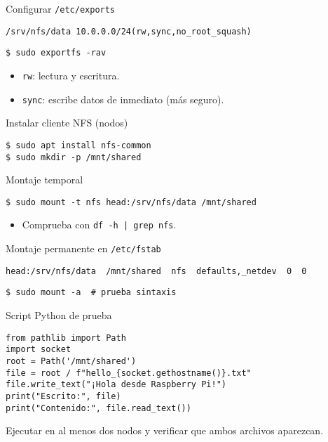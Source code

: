 \documentclass[aspectratio=169,professionalfonts]{beamer}
\begin{document}
\begin{frame}[fragile]{Configurar \texttt{/etc/exports}}
  \begin{verbatim}
/srv/nfs/data 10.0.0.0/24(rw,sync,no_root_squash)
  \end{verbatim}
  \begin{verbatim}
$ sudo exportfs -rav
  \end{verbatim}
  \begin{itemize}
    \item \texttt{rw}: lectura y escritura.
    \item \texttt{sync}: escribe datos de inmediato (más seguro).
  \end{itemize}
\end{frame}

\begin{frame}[fragile]{Instalar cliente NFS (nodos)}
  \begin{verbatim}
$ sudo apt install nfs-common
$ sudo mkdir -p /mnt/shared
  \end{verbatim}
\end{frame}

\begin{frame}[fragile]{Montaje temporal}
  \begin{verbatim}
$ sudo mount -t nfs head:/srv/nfs/data /mnt/shared
  \end{verbatim}
  \begin{itemize}
    \item Comprueba con \texttt{df -h | grep nfs}.
  \end{itemize}
\end{frame}

\begin{frame}[fragile]{Montaje permanente en \texttt{/etc/fstab}}
  \begin{verbatim}
head:/srv/nfs/data  /mnt/shared  nfs  defaults,_netdev  0  0
  \end{verbatim}
  \begin{verbatim}
$ sudo mount -a  # prueba sintaxis
  \end{verbatim}
\end{frame}

\begin{frame}[fragile]{Script Python de prueba}
  \begin{verbatim}
from pathlib import Path
import socket
root = Path('/mnt/shared')
file = root / f"hello_{socket.gethostname()}.txt"
file.write_text("¡Hola desde Raspberry Pi!")
print("Escrito:", file)
print("Contenido:", file.read_text())
  \end{verbatim}
  Ejecutar en al menos dos nodos y verificar que ambos archivos aparezcan.
\end{frame}
\end{document}
